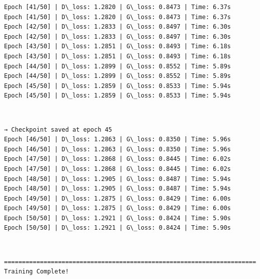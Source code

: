 \documentclass[11pt]{article}
\begin{document}
    \begin{Verbatim}[commandchars=\\\{\}]
Epoch [41/50] | D\_loss: 1.2820 | G\_loss: 0.8473 | Time: 6.37s
Epoch [41/50] | D\_loss: 1.2820 | G\_loss: 0.8473 | Time: 6.37s
Epoch [42/50] | D\_loss: 1.2833 | G\_loss: 0.8497 | Time: 6.30s
Epoch [42/50] | D\_loss: 1.2833 | G\_loss: 0.8497 | Time: 6.30s
Epoch [43/50] | D\_loss: 1.2851 | G\_loss: 0.8493 | Time: 6.18s
Epoch [43/50] | D\_loss: 1.2851 | G\_loss: 0.8493 | Time: 6.18s
Epoch [44/50] | D\_loss: 1.2899 | G\_loss: 0.8552 | Time: 5.89s
Epoch [44/50] | D\_loss: 1.2899 | G\_loss: 0.8552 | Time: 5.89s
Epoch [45/50] | D\_loss: 1.2859 | G\_loss: 0.8533 | Time: 5.94s
Epoch [45/50] | D\_loss: 1.2859 | G\_loss: 0.8533 | Time: 5.94s
    \end{Verbatim}

    \begin{center}
    \end{center}
    { \hspace*{\fill} \\}
    
    \begin{Verbatim}[commandchars=\\\{\}]
  → Checkpoint saved at epoch 45
Epoch [46/50] | D\_loss: 1.2863 | G\_loss: 0.8350 | Time: 5.96s
Epoch [46/50] | D\_loss: 1.2863 | G\_loss: 0.8350 | Time: 5.96s
Epoch [47/50] | D\_loss: 1.2868 | G\_loss: 0.8445 | Time: 6.02s
Epoch [47/50] | D\_loss: 1.2868 | G\_loss: 0.8445 | Time: 6.02s
Epoch [48/50] | D\_loss: 1.2905 | G\_loss: 0.8487 | Time: 5.94s
Epoch [48/50] | D\_loss: 1.2905 | G\_loss: 0.8487 | Time: 5.94s
Epoch [49/50] | D\_loss: 1.2875 | G\_loss: 0.8429 | Time: 6.00s
Epoch [49/50] | D\_loss: 1.2875 | G\_loss: 0.8429 | Time: 6.00s
Epoch [50/50] | D\_loss: 1.2921 | G\_loss: 0.8424 | Time: 5.90s
Epoch [50/50] | D\_loss: 1.2921 | G\_loss: 0.8424 | Time: 5.90s
    \end{Verbatim}

    \begin{center}
    \end{center}
    { \hspace*{\fill} \\}
    
    \begin{Verbatim}[commandchars=\\\{\}]
======================================================================
Training Complete!
    \end{Verbatim}
\end{document}
